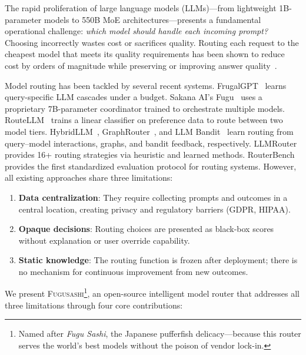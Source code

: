 \documentclass[11pt,a4paper]{article}
\newcommand{\fugusashi}{\textsc{Fugusashi}}
\begin{document}
The rapid proliferation of large language models (LLMs)---from lightweight 1B-parameter models to 550B MoE architectures---presents a fundamental operational challenge: \textit{which model should handle each incoming prompt?}
Choosing incorrectly wastes cost or sacrifices quality.
Routing each request to the cheapest model that meets its quality requirements has been shown to reduce cost by orders of magnitude while preserving or improving answer quality~\cite{frugalgpt2023,routerbench2024}.

Model routing has been tackled by several recent systems.
FrugalGPT~\cite{frugalgpt2023} learns query-specific LLM cascades under a budget.
Sakana AI's Fugu~\cite{fugu2026} uses a proprietary 7B-parameter coordinator trained to orchestrate multiple models.
RouteLLM~\cite{routellm2024} trains a linear classifier on preference data to route between two model tiers.
HybridLLM~\cite{hybridllm2024}, GraphRouter~\cite{graphrouter2024}, and LLM Bandit~\cite{llmbandit2025} learn routing from query--model interactions, graphs, and bandit feedback, respectively.
LLMRouter~\cite{llmrouter2024} provides 16+ routing strategies via heuristic and learned methods.
RouterBench~\cite{routerbench2024} provides the first standardized evaluation protocol for routing systems.
However, all existing approaches share three limitations:

\begin{enumerate}[leftmargin=*]
    \item \textbf{Data centralization}: They require collecting prompts and outcomes in a central location, creating privacy and regulatory barriers (GDPR, HIPAA).
    \item \textbf{Opaque decisions}: Routing choices are presented as black-box scores without explanation or user override capability.
    \item \textbf{Static knowledge}: The routing function is frozen after deployment; there is no mechanism for continuous improvement from new outcomes.
\end{enumerate}

We present \fugusashi{}\footnote{Named after \textit{Fugu Sashi}, the Japanese pufferfish delicacy---because this router serves the world's best models without the poison of vendor lock-in.}, an open-source intelligent model router that addresses all three limitations through four core contributions:
\end{document}
